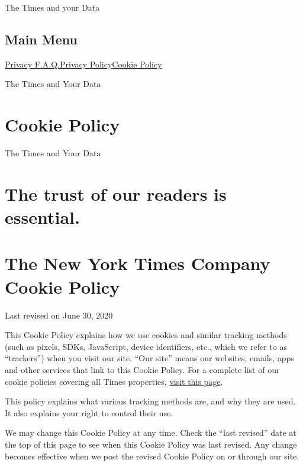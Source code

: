 The Times and your Data

\hypertarget{main-menu}{%
\subsection{Main Menu}\label{main-menu}}

\href{/privacy}{Privacy F.A.Q.}\href{/privacy/privacy-policy}{Privacy
Policy}\href{/privacy/cookie-policy}{Cookie Policy}

The Times and Your Data

\hypertarget{cookie-policy}{%
\section{Cookie Policy}\label{cookie-policy}}

The Times and Your Data

\hypertarget{the-trust-of-our-readers-is-essential}{%
\section{The trust of our readers is
essential.}\label{the-trust-of-our-readers-is-essential}}

\hypertarget{the-new-york-times-company-cookie-policy}{%
\section{The New York Times Company Cookie
Policy}\label{the-new-york-times-company-cookie-policy}}

Last revised on June 30, 2020

This Cookie Policy explains how we use cookies and similar tracking
methods (such as pixels, SDKs, JavaScript, device identifiers, etc.,
which we refer to as ``trackers'') when you visit our site. ``Our site''
means our websites, emails, apps and other services that link to this
Cookie Policy. For a complete list of our cookie policies covering all
Times properties,
\href{https://www.nytimes.com/subscription/dg-cookie-policy/cookie-policy.html}{visit
this page}.

This policy explains what various tracking methods are, and why they are
used. It also explains your right to control their use.

We may change this Cookie Policy at any time. Check the ``last revised''
date at the top of this page to see when this Cookie Policy was last
revised. Any change becomes effective when we post the revised Cookie
Policy on or through our site.

